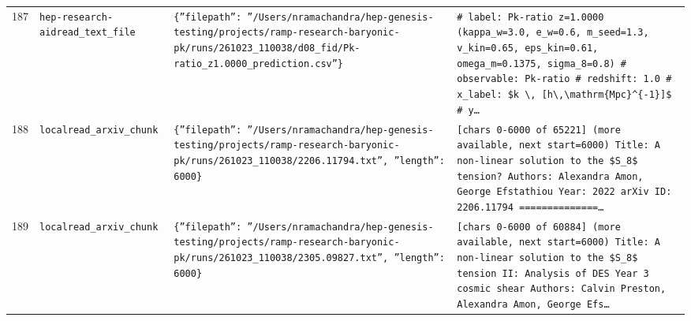 \documentclass[11pt,a4paper]{article}
\begin{document}
\begin{longtable}{@{}p{}p{}p{}p{}@{}}
187 & \texttt{hep-research-aid}\newline\texttt{read\_\allowbreak{}text\_\allowbreak{}file} & \texttt{\{''filepath'':\allowbreak{} ''/\allowbreak{}Users/\allowbreak{}nramachandra/\allowbreak{}hep-genesis-testing/\allowbreak{}projects/\allowbreak{}ramp-research-baryonic-pk/\allowbreak{}runs/\allowbreak{}261023\_\allowbreak{}110038/\allowbreak{}d08\_\allowbreak{}fid/\allowbreak{}Pk-ratio\_\allowbreak{}z1.0000\_\allowbreak{}prediction.csv''\}\allowbreak{}} & \texttt{\# label:\allowbreak{} Pk-ratio z=\allowbreak{}1.0000 (kappa\_\allowbreak{}w=\allowbreak{}3.0,\allowbreak{} e\_\allowbreak{}w=\allowbreak{}0.6,\allowbreak{} m\_\allowbreak{}seed=\allowbreak{}1.3,\allowbreak{} v\_\allowbreak{}kin=\allowbreak{}0.65,\allowbreak{} eps\_\allowbreak{}kin=\allowbreak{}0.61,\allowbreak{} omega\_\allowbreak{}m=\allowbreak{}0.1375,\allowbreak{} sigma\_\allowbreak{}8=\allowbreak{}0.8)\allowbreak{} \# observable:\allowbreak{} Pk-ratio \# redshift:\allowbreak{} 1.0 \# x\_\allowbreak{}label:\allowbreak{} \$k \textbackslash{}\allowbreak{},\allowbreak{} [h\textbackslash{}\allowbreak{},\allowbreak{}\textbackslash{}\allowbreak{}mathrm\{Mpc\}\allowbreak{}\textasciicircum{}\allowbreak{}\{-1\}\allowbreak{}]\allowbreak{}\$ \# y\ldots{}\allowbreak{}} \\
188 & \texttt{local}\newline\texttt{read\_\allowbreak{}arxiv\_\allowbreak{}chunk} & \texttt{\{''filepath'':\allowbreak{} ''/\allowbreak{}Users/\allowbreak{}nramachandra/\allowbreak{}hep-genesis-testing/\allowbreak{}projects/\allowbreak{}ramp-research-baryonic-pk/\allowbreak{}runs/\allowbreak{}261023\_\allowbreak{}110038/\allowbreak{}2206.11794.txt'',\allowbreak{} ''length'':\allowbreak{} 6000\}\allowbreak{}} & \texttt{[chars 0-6000 of 65221]\allowbreak{} (more available,\allowbreak{} next start=\allowbreak{}6000)\allowbreak{}  Title:\allowbreak{} A non-linear solution to the \$S\_\allowbreak{}8\$ tension? Authors:\allowbreak{} Alexandra Amon,\allowbreak{} George Efstathiou Year:\allowbreak{} 2022 arXiv ID:\allowbreak{} 2206.11794  =\allowbreak{}=\allowbreak{}=\allowbreak{}=\allowbreak{}=\allowbreak{}=\allowbreak{}=\allowbreak{}=\allowbreak{}=\allowbreak{}=\allowbreak{}=\allowbreak{}=\allowbreak{}=\allowbreak{}=\allowbreak{}\ldots{}\allowbreak{}} \\
189 & \texttt{local}\newline\texttt{read\_\allowbreak{}arxiv\_\allowbreak{}chunk} & \texttt{\{''filepath'':\allowbreak{} ''/\allowbreak{}Users/\allowbreak{}nramachandra/\allowbreak{}hep-genesis-testing/\allowbreak{}projects/\allowbreak{}ramp-research-baryonic-pk/\allowbreak{}runs/\allowbreak{}261023\_\allowbreak{}110038/\allowbreak{}2305.09827.txt'',\allowbreak{} ''length'':\allowbreak{} 6000\}\allowbreak{}} & \texttt{[chars 0-6000 of 60884]\allowbreak{} (more available,\allowbreak{} next start=\allowbreak{}6000)\allowbreak{}  Title:\allowbreak{} A non-linear solution to the \$S\_\allowbreak{}8\$ tension II:\allowbreak{} Analysis of DES Year 3 cosmic shear Authors:\allowbreak{} Calvin Preston,\allowbreak{} Alexandra Amon,\allowbreak{} George Efs\ldots{}\allowbreak{}} \\

\end{longtable}
\end{document}
